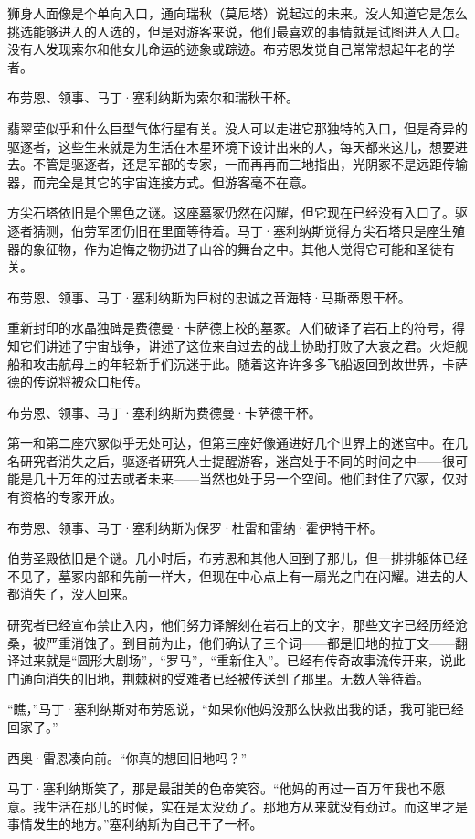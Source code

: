 \documentclass[AutoFakeBold=true]{book}
\begin{document}
狮身人面像是个单向入口，通向瑞秋（莫尼塔）说起过的未来。没人知道它是怎么挑选能够进入的人选的，但是对游客来说，他们最喜欢的事情就是试图进入入口。没有人发现索尔和他女儿命运的迹象或踪迹。布劳恩发觉自己常常想起年老的学者。

布劳恩、领事、马丁·塞利纳斯为索尔和瑞秋干杯。

翡翠茔似乎和什么巨型气体行星有关。没人可以走进它那独特的入口，但是奇异的驱逐者，这些生来就是为生活在木星环境下设计出来的人，每天都来这儿，想要进去。不管是驱逐者，还是军部的专家，一而再再而三地指出，光阴冢不是远距传输器，而完全是其它的宇宙连接方式。但游客毫不在意。

方尖石塔依旧是个黑色之谜。这座墓冢仍然在闪耀，但它现在已经没有入口了。驱逐者猜测，伯劳军团仍旧在里面等待着。马丁·塞利纳斯觉得方尖石塔只是座生殖器的象征物，作为追悔之物扔进了山谷的舞台之中。其他人觉得它可能和圣徒有关。

布劳恩、领事、马丁·塞利纳斯为巨树的忠诚之音海特·马斯蒂恩干杯。

重新封印的水晶独碑是费德曼·卡萨德上校的墓冢。人们破译了岩石上的符号，得知它们讲述了宇宙战争，讲述了这位来自过去的战士协助打败了大哀之君。火炬舰船和攻击航母上的年轻新手们沉迷于此。随着这许许多多飞船返回到故世界，卡萨德的传说将被众口相传。

布劳恩、领事、马丁·塞利纳斯为费德曼·卡萨德干杯。

第一和第二座穴冢似乎无处可达，但第三座好像通进好几个世界上的迷宫中。在几名研究者消失之后，驱逐者研究人士提醒游客，迷宫处于不同的时间之中——很可能是几十万年的过去或者未来——当然也处于另一个空间。他们封住了穴冢，仅对有资格的专家开放。

布劳恩、领事、马丁·塞利纳斯为保罗·杜雷和雷纳·霍伊特干杯。

伯劳圣殿依旧是个谜。几小时后，布劳恩和其他人回到了那儿，但一排排躯体已经不见了，墓冢内部和先前一样大，但现在中心点上有一扇光之门在闪耀。进去的人都消失了，没人回来。

研究者已经宣布禁止入内，他们努力译解刻在岩石上的文字，那些文字已经历经沧桑，被严重消蚀了。到目前为止，他们确认了三个词——都是旧地的拉丁文——翻译过来就是``圆形大剧场''，``罗马''，``重新住入''。已经有传奇故事流传开来，说此门通向消失的旧地，荆棘树的受难者已经被传送到了那里。无数人等待着。

``瞧，''马丁·塞利纳斯对布劳恩说，``如果你他妈没那么快救出我的话，我可能已经回家了。''

西奥·雷恩凑向前。``你真的想回旧地吗？''

马丁·塞利纳斯笑了，那是最甜美的色帝笑容。``他妈的再过一百万年我也不愿意。我生活在那儿的时候，实在是太没劲了。那地方从来就没有劲过。而这里才是事情发生的地方。''塞利纳斯为自己干了一杯。
\end{document}
